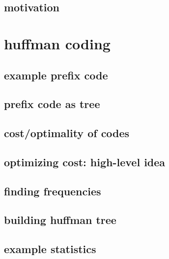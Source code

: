 \subsection{motivation}



\section{huffman coding}

\subsection{example prefix code}



\subsection{prefix code as tree}

\subsection{cost/optimality of codes}

\subsection{optimizing cost: high-level idea}


\subsection{finding frequencies}


\subsection{building huffman tree}



\subsection{example statistics}

